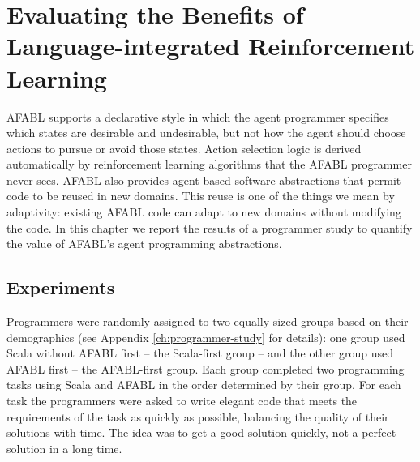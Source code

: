 \chapter{Evaluating the Benefits of Language-integrated Reinforcement Learning}\label{ch:afabl-study}







AFABL supports a declarative style in which the agent programmer specifies which states are desirable and undesirable, but not how the agent should choose actions to pursue or avoid those states. Action selection logic is derived automatically by reinforcement learning algorithms that the AFABL programmer never sees. AFABL also provides agent-based software abstractions that permit code to be reused in new domains. This reuse is one of the things we mean by adaptivity: existing AFABL code can adapt to new domains without modifying the code. In this chapter we report the results of a programmer study to quantify the value of AFABL's agent programming abstractions.

\section{Experiments}

Programmers were randomly assigned to two equally-sized groups based on their demographics (see Appendix \ref{ch:programmer-study} for details): one group used Scala without AFABL first -- the Scala-first group -- and the other group used AFABL first -- the AFABL-first group.  Each group completed two programming tasks using Scala and AFABL in the order determined by their group.  For each task the programmers were asked to write elegant code that meets the requirements of the task as quickly as possible, balancing the quality of their solutions with time.  The idea was to get a good solution quickly, not a perfect solution in a long time.

